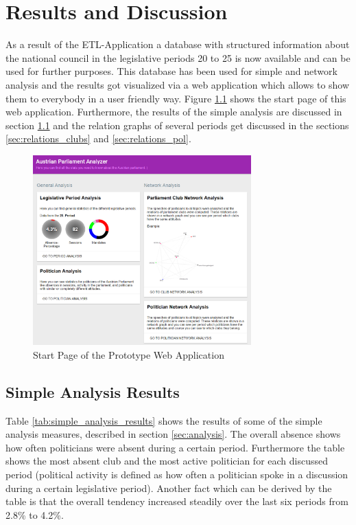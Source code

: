 

\chapter{Results and Discussion}
\label{chap:evaluation}

As a result of the ETL-Application a database with structured information about the national council in the legislative periods 20 to 25 is now available and can be used for further purposes. This database has been used for simple and network analysis and the results got visualized via a web application which allows to show them to everybody in a user friendly way. Figure \ref{fig:start_page_prototype} shows the start page of this web application. Furthermore, the results of the simple analysis are discussed in section \ref{sec:simple_analysis_res} and the relation graphs of several periods get discussed in the sections \ref{sec:relations_clubs} and \ref{sec:relations_pol}. 

\begin{figure}[h]
	\center
	\includegraphics[width=0.75\textwidth]{imgs/result_start_page}
	\caption{Start Page of the Prototype Web Application}
	\label{fig:start_page_prototype}
\end{figure}

\section{Simple Analysis Results}
\label{sec:simple_analysis_res}
Table \ref{tab:simple_analysis_results} shows the results of some of the simple analysis measures, described in section \ref{sec:analysis}. The overall absence shows how often politicians were absent during a certain period. Furthermore the table shows the most absent club and the most active politician for each discussed period (political activity is defined as how often a politician spoke in a discussion during a certain legislative period). Another fact which can be derived by the table is that the overall tendency increased steadily over the last six periods from 2.8\% to 4.2\%.

